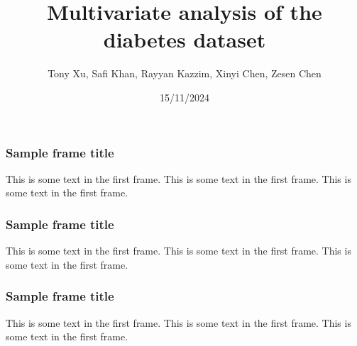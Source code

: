 \documentclass{beamer}
\title{Multivariate analysis of the diabetes dataset}
\author{Tony Xu, Safi Khan, Rayyan Kazzim, Xinyi Chen, Zesen Chen}
\institute{McMaster University}
\date{15/11/2024}
\begin{document}
\frame{\titlepage}

\begin{frame}
\frametitle{Sample frame title}
This is some text in the first frame. This is some text in the first frame. This is some text in the first frame.
\end{frame}

\begin{frame}
    \frametitle{Sample frame title}
    This is some text in the first frame. This is some text in the first frame. This is some text in the first frame.
\end{frame}

\begin{frame}
    \frametitle{Sample frame title}
        This is some text in the first frame. This is some text in the first frame. This is some text in the first frame.
\end{frame}
\end{document}
